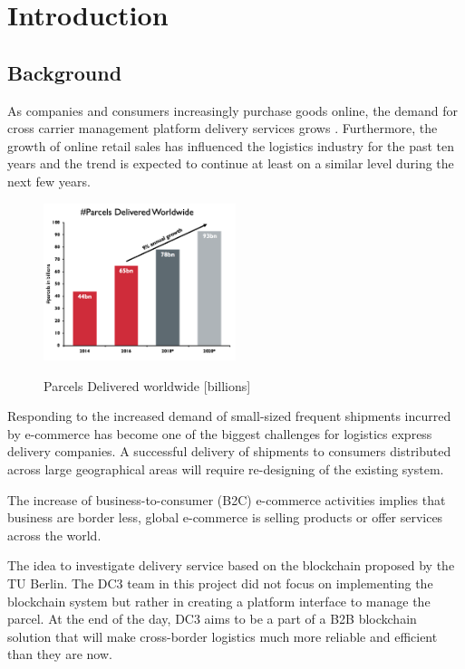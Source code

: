 \chapter{Introduction}
\label{cha:introduction}


\section{Background}

As companies and consumers increasingly purchase goods online, the demand for cross carrier management platform
delivery services grows . Furthermore, the growth of online retail
sales has influenced the logistics industry for the past ten years and the trend is expected to
continue at least on a similar level during the next few years. 

\begin{figure}[!ht]
	\centering
	\includegraphics[width=0.5\textwidth]{images/ParcelsDel.png}\\
	\caption{Parcels Delivered worldwide [billions]}
	\label{fig:introduction__loremipsum}
\end{figure}

Responding to the increased demand of small-sized frequent shipments incurred by e-commerce has become one of the biggest challenges for logistics express delivery companies.
A successful delivery of shipments to consumers distributed across large geographical areas
will require re-designing of the existing system.

The increase of business-to-consumer (B2C) e-commerce activities implies that business are border less, global e-commerce is selling products or offer services across the world.


The idea to investigate delivery service based on the  blockchain proposed by the TU Berlin. The DC3 team in this project did not focus on implementing the blockchain system but rather in creating a platform interface to manage the parcel. At the end of the day, DC3 aims to be a part of a B2B blockchain solution that will make cross-border logistics much more reliable and efficient than they are now.   

